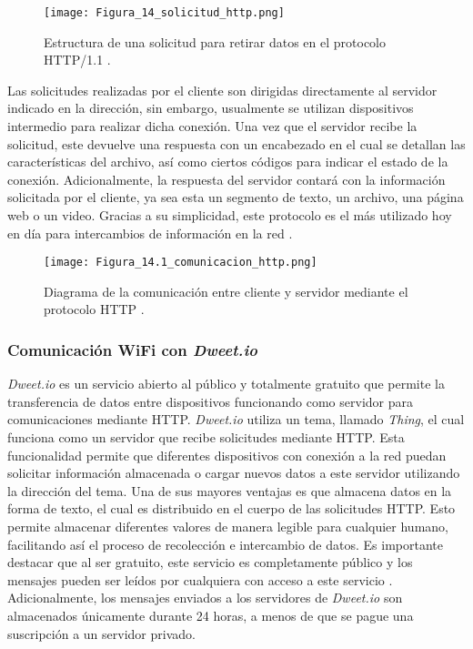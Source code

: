 \begin{figure}[H]
	\centering
	\texttt{[image: Figura\_14\_solicitud\_http.png]}
	\caption{Estructura de una solicitud para retirar datos en el protocolo HTTP/1.1 \cite{overview_http_mozilla_2024}.}
	\label{fig:mesh14}
\end{figure}

Las solicitudes realizadas por el cliente son dirigidas directamente al servidor indicado en la dirección, sin embargo, usualmente se utilizan dispositivos intermedio para realizar dicha conexión. Una vez que el servidor recibe la solicitud, este devuelve una respuesta con un encabezado en el cual se detallan las características del archivo, así como ciertos códigos para indicar el estado de la conexión. Adicionalmente, la respuesta del servidor contará con la información solicitada por el cliente, ya sea esta un segmento de texto, un archivo, una página web o un video. Gracias a su simplicidad, este protocolo es el más utilizado hoy en día para intercambios de información en la red \cite{overview_http_mozilla_2024}.

\begin{figure}[H]
	\centering
	\texttt{[image: Figura\_14.1\_comunicacion\_http.png]}
	\caption{Diagrama de la comunicación entre cliente y servidor mediante el protocolo HTTP \cite{overview_http_mozilla_2024}.}
	\label{fig:mesh14_1}
\end{figure}

\subsubsection*{Comunicación WiFi con \textit{Dweet.io}}
\textit{Dweet.io} es un servicio abierto al público y totalmente gratuito que permite la transferencia de datos entre dispositivos funcionando como servidor para comunicaciones mediante HTTP. \textit{Dweet.io} utiliza un tema, llamado \textit{Thing}, el cual funciona como un servidor que recibe solicitudes mediante HTTP. Esta funcionalidad permite que diferentes dispositivos con conexión a la red puedan solicitar información almacenada o cargar nuevos datos a este servidor utilizando la dirección del tema. Una de sus mayores ventajas es que almacena datos en la forma de texto, el cual es distribuido en el cuerpo de las solicitudes HTTP. Esto permite almacenar diferentes valores de manera legible para cualquier humano, facilitando así el proceso de recolección e intercambio de datos. Es importante destacar que al ser gratuito, este servicio es completamente público y los mensajes pueden ser leídos por cualquiera con acceso a este servicio \cite{dweet_dweetio_faq}. Adicionalmente, los mensajes enviados a los servidores de \textit{Dweet.io} son almacenados únicamente durante 24 horas, a menos de que se pague una suscripción a un servidor privado.

